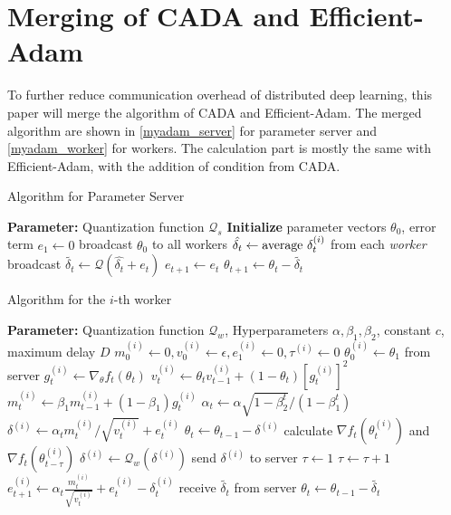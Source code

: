\section{Merging of CADA and Efficient-Adam}
To further reduce communication overhead of distributed deep learning, this paper will merge the algorithm of CADA and Efficient-Adam. The merged algorithm are shown in \autoref{myadam_server} for parameter server and \autoref{myadam_worker} for workers. The calculation part is mostly the same with Efficient-Adam, with the addition of condition from CADA.

\begin{algorithm}[htbp]
  \caption{Algorithm for Parameter Server}\label{myadam_server}
  \begin{algorithmic}[1]
    \State \textbf{Parameter:} Quantization function $\mathcal{Q}_s$
    \State \textbf{Initialize} parameter vectors $\theta_0$, error term $e_1 \gets 0$
    \State broadcast $\theta_0$ to all workers
    \State $\hat{\delta_t} \gets \textnormal{average } \delta_t^{(i)}$ from each \textit{worker}
    \State broadcast $\tilde{\delta_t} \gets \mathcal{Q}(\hat{\delta_t} + e_t)$
    \State $e_{t+1} \gets e_{t}$
    \State $\theta_{t+1} \gets \theta_t - \tilde{\delta_t}$
    \EndFor
  \end{algorithmic}
\end{algorithm}

\begin{algorithm}[htbp]
  \caption{Algorithm for the $i$-th worker}\label{myadam_worker}
  \begin{algorithmic}[1]
    \State \textbf{Parameter:} Quantization function $\mathcal{Q}_w$, Hyperparameters $\alpha, \beta_1, \beta_2$, constant $c$, maximum delay $D$
    \State $m_0^{(i)} \gets 0, v_0^{(i)} \gets \epsilon, e_1^{(i)} \gets 0, \tau^{(i)} \gets 0$
    \State $\theta^{(i)}_0 \gets \theta_1$ from server
    \State $g_t^{(i)} \gets \nabla_\theta f_t(\theta_{t})$
    \State $v_t^{(i)} \gets \theta_t v_{t-1}^{(i)} + (1-\theta_t)[g_t^{(i)}]^2$
    \State $m_t^{(i)} \gets \beta_1 m_{t-1}^{(i)} + (1-\beta_1)g_t^{(i)}$
    \State $\alpha_t \gets \alpha \sqrt{1-\beta_2^t}/(1-\beta_1^t)$
    \State $\delta^{(i)} \gets \alpha_t m_t^{(i)}/\sqrt{v_t^{(i)}}+e_t^{(i)}$
    \State $\theta_t \gets \theta_{t-1} - \delta^{(i)}$
    \State calculate $\nabla f_t(\theta^{(i)}_{t})$ and $\nabla f_t(\theta^{(i)}_{t-\tau})$
    \State $\delta^{(i)} \gets \mathcal{Q}_w(\delta^{(i)})$
    \State send $\delta^{(i)}$ to server
    \State $\tau \gets 1$
    \Else
    \State $\tau \gets \tau + 1$
    \EndIf
    \State $e_{t+1}^{(i)} \gets \alpha_t \frac{m_t^{(i)}}{\sqrt{v_t^{(i)}}} + e_t^{(i)} - \delta_t^{(i)}$
    \State receive $\tilde{\delta_t}$ from server
    \State $\theta_{t} \gets \theta_{t-1} - \tilde{\delta_t}$
    \EndFor
  \end{algorithmic}
\end{algorithm}

